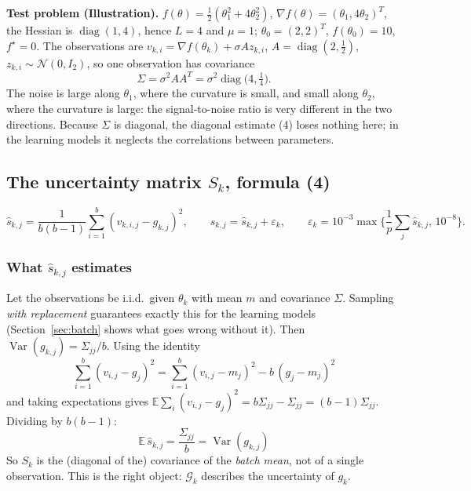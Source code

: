 \documentclass[11pt,a4paper]{article}
\newcommand{\G}{\mathcal{G}_k}
\newcommand{\E}{\mathbb{E}}
\DeclareMathOperator{\diag}{diag}
\DeclareMathOperator{\Var}{Var}
\begin{document}
\textbf{Test problem (Illustration).}
$f(\theta)=\tfrac12(\theta_1^2+4\theta_2^2)$, $\nabla f(\theta)=(\theta_1,4\theta_2)^T$,
the Hessian is $\diag(1,4)$, hence $L=4$ and $\mu=1$; $\theta_0=(2,2)^T$,
$f(\theta_0)=10$, $f^\star=0$. The observations are
$v_{k,i}=\nabla f(\theta_k)+\sigma Az_{k,i}$, $A=\diag(2,\tfrac12)$,
$z_{k,i}\sim\mathcal N(0,I_2)$, so one observation has covariance
\begin{equation*}
\Sigma=\sigma^2AA^T=\sigma^2\diag\big(4,\tfrac14\big).
\end{equation*}
The noise is large along $\theta_1$, where the curvature is small, and small along
$\theta_2$, where the curvature is large: the signal-to-noise ratio is very different
in the two directions. Because $\Sigma$ is diagonal, the diagonal estimate (4) loses
nothing here; in the learning models it neglects the correlations between
parameters.

\subsection{The uncertainty matrix $S_k$, formula (4)}\label{sec:S}

\begin{equation*}
\widehat s_{k,j}=\frac1{b(b-1)}\sum_{i=1}^b(v_{k,i,j}-g_{k,j})^2,\qquad
s_{k,j}=\widehat s_{k,j}+\varepsilon_k,\qquad
\varepsilon_k=10^{-3}\max\Big\{\frac1p\sum_j\widehat s_{k,j},\,10^{-8}\Big\}.
\end{equation*}

\subsubsection*{What $\widehat s_{k,j}$ estimates}

Let the observations be i.i.d.\ given $\theta_k$ with mean $m$ and covariance
$\Sigma$. Sampling \emph{with replacement} guarantees exactly this for the learning
models (Section~\ref{sec:batch} shows what goes wrong without it). Then
$\Var(g_{k,j})=\Sigma_{jj}/b$. Using the identity
\begin{equation*}
\sum_{i=1}^b(v_{i,j}-g_j)^2=\sum_{i=1}^b(v_{i,j}-m_j)^2-b\,(g_j-m_j)^2
\end{equation*}
and taking expectations gives $\E\sum_i(v_{i,j}-g_j)^2=b\Sigma_{jj}-\Sigma_{jj}
=(b-1)\Sigma_{jj}$. Dividing by $b(b-1)$:
\begin{equation*}
\boxed{\;\E\,\widehat s_{k,j}=\frac{\Sigma_{jj}}b=\Var(g_{k,j})\;}
\end{equation*}
So $S_k$ is the (diagonal of the) covariance of the \emph{batch mean}, not of a single
observation. This is the right object: $\G$ describes the uncertainty of $g_k$.
\end{document}
